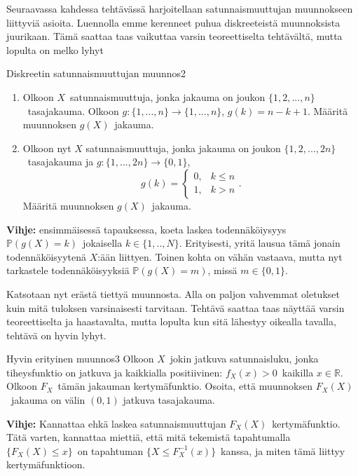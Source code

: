 \documentclass[11pt,a4paper]{amsart}
\newcommand{\R}{\mathbb{R}}
\newcommand{\1}{\mathbf{1}}
\renewcommand{\P}{\mathbb P}
\begin{document}
Seuraavassa kahdessa tehtävässä harjoitellaan satunnaismuuttujan muunnokseen liittyviä asioita. Luennolla emme kerenneet puhua diskreeteistä muunnoksista juurikaan. Tämä saattaa taas vaikuttaa varsin teoreettiselta tehtävältä, mutta lopulta on melko lyhyt
\begin{Exercises}{Diskreetin satunnaismuuttujan muunnos}{2}
\begin{enumerate}
\item Olkoon $X$ satunnaismuuttuja, jonka jakauma on joukon $\{1,2,...,n\}$ tasajakauma. Olkoon $g:\{1,...,n\}\to \{1,...,n\}$, $g(k)=n-k+1$. Määritä muunnoksen $g(X)$ jakauma.


\item Olkoon nyt $X$ satunnaismuuttuja, jonka jakauma on joukon $\{1,2,...,2n\}$ tasajakauma ja $g:\{1,...,2n\}\to \{0,1\}$, 
\[
g(k)=\begin{cases}
0, & k\leq n\\
1, & k>n
\end{cases}.
\]
Määritä muunnoksen $g(X)$ jakauma.


\end{enumerate}
{\bf Vihje: } ensimmäisessä tapauksessa, koeta laskea todennäköiysyys $\P(g(X)=k)$ jokaisella $k\in \{1,..,N\}$. Erityisesti, yritä lausua tämä jonain todennäköisyytenä $X$:ään liittyen. Toinen kohta on vähän vastaava, mutta nyt tarkastele todennäköisyyksiä $\P(g(X)=m)$, missä $m\in \{0,1\}$.
\end{Exercises}


Katsotaan nyt erästä tiettyä muunnosta. Alla on paljon vahvemmat oletukset kuin mitä tuloksen varsinaisesti tarvitaan. Tehtävä saattaa taas näyttää varsin teoreettiselta ja haastavalta, mutta lopulta kun sitä lähestyy oikealla tavalla, tehtävä on hyvin lyhyt.
\begin{Exercises}{Hyvin erityinen muunnos}{3}
Olkoon $X$ jokin jatkuva satunnaisluku, jonka tiheysfunktio on jatkuva ja kaikkialla positiivinen: $f_X(x)>0$ kaikilla $x\in \R$. Olkoon $F_X$ tämän jakauman kertymäfunktio. Osoita, että muunnoksen $F_X(X)$ jakauma on välin $(0,1)$ jatkuva tasajakauma.
\medskip 

{\bf Vihje: } Kannattaa ehkä laskea satunnaismuuttujan $F_X(X)$ kertymäfunktio. Tätä varten, kannattaa miettiä, että mitä tekemistä tapahtumalla $\{F_X(X)\leq x\}$ on tapahtuman $\{X\leq F_X^{-1}(x)\}$ kanssa, ja miten tämä liittyy kertymäfunktioon.


\end{Exercises}
\end{document}
